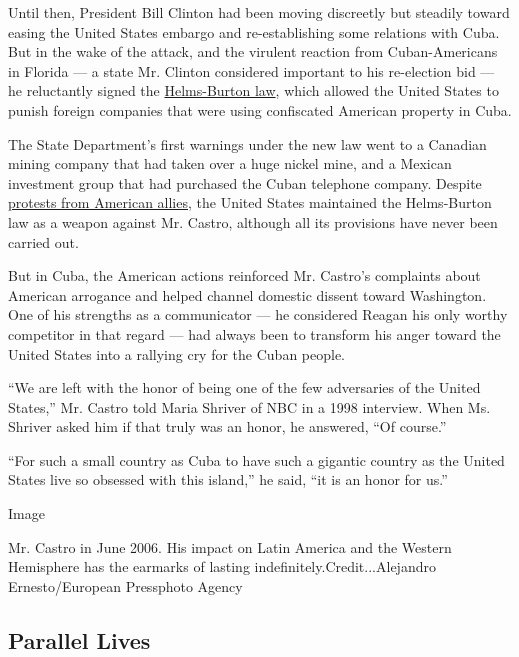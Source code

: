 Until then, President Bill Clinton had been moving discreetly but
steadily toward easing the United States embargo and re-establishing
some relations with Cuba. But in the wake of the attack, and the
virulent reaction from Cuban-Americans in Florida --- a state Mr.
Clinton considered important to his re-election bid --- he reluctantly
signed the
\href{http://www.nytimes3xbfgragh.onion/1995/09/22/world/bill-tighten-economic-embargo-cuba-passed-with-strong-support-house.html}{Helms-Burton
law}, which allowed the United States to punish foreign companies that
were using confiscated American property in Cuba.

The State Department's first warnings under the new law went to a
Canadian mining company that had taken over a huge nickel mine, and a
Mexican investment group that had purchased the Cuban telephone company.
Despite
\href{http://www.nytimes3xbfgragh.onion/1996/06/13/world/canada-and-mexico-join-to-oppose-us-law-on-cuba.html}{protests
from American allies}, the United States maintained the Helms-Burton law
as a weapon against Mr. Castro, although all its provisions have never
been carried out.

But in Cuba, the American actions reinforced Mr. Castro's complaints
about American arrogance and helped channel domestic dissent toward
Washington. One of his strengths as a communicator --- he considered
Reagan his only worthy competitor in that regard --- had always been to
transform his anger toward the United States into a rallying cry for the
Cuban people.

``We are left with the honor of being one of the few adversaries of the
United States,'' Mr. Castro told Maria Shriver of NBC in a 1998
interview. When Ms. Shriver asked him if that truly was an honor, he
answered, ``Of course.''

``For such a small country as Cuba to have such a gigantic country as
the United States live so obsessed with this island,'' he said, ``it is
an honor for us.''

Image

Mr. Castro in June 2006. His impact on Latin America and the Western
Hemisphere has the earmarks of lasting indefinitely.Credit...Alejandro
Ernesto/European Pressphoto Agency

\hypertarget{parallel-lives}{%
\subsection{Parallel Lives}\label{parallel-lives}}

